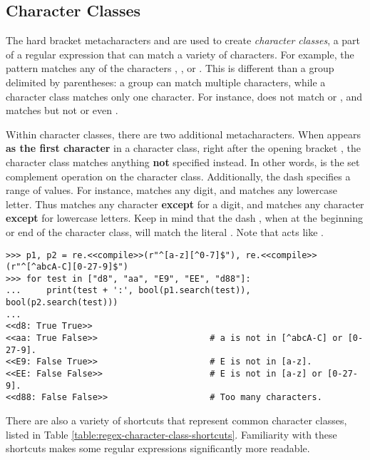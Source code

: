 \subsection*{Character Classes} %

The hard bracket metacharacters \li{[} and \li{]} are used to create \emph{character classes}, a part of a regular expression that can match a variety of characters.
For example, the pattern \li{[abc]} matches any of the characters , , or .
This is different than a group delimited by parentheses: a group can match multiple characters, while a character class matches only one character.
For instance, \li{[abc]} does not match  or , and  matches  but not  or even .

Within character classes, there are two additional metacharacters.
When \li{^} appears \textbf{as the first character} in a character class, right after the opening bracket \li{[}, the character class matches anything \textbf{not} specified instead.
In other words, \li{^} is the set complement operation on the character class.
Additionally, the dash \li{-} specifies a range of values.
For instance, \li{[0-9]} matches any digit, and \li{[a-z]} matches any lowercase letter.
Thus \li{[^0-9]} matches any character \textbf{except} for a digit, and \li{[^a-z]} matches any character \textbf{except} for lowercase letters. Keep in mind that the dash \li{-}, when at the beginning or end of the character class, will match the literal .
Note that \li{[0-27-9]} acts like \li{[(0-2)|(7-9)]}.


\begin{lstlisting}
>>> p1, p2 = re.<<compile>>(r"^[a-z][^0-7]$"), re.<<compile>>(r"^[^abcA-C][0-27-9]$")
>>> for test in ["d8", "aa", "E9", "EE", "d88"]:
...     print(test + ':', bool(p1.search(test)), bool(p2.search(test)))
...
<<d8: True True>>
<<aa: True False>>                      # a is not in [^abcA-C] or [0-27-9].
<<E9: False True>>                      # E is not in [a-z].
<<EE: False False>>                     # E is not in [a-z] or [0-27-9].
<<d88: False False>>                    # Too many characters.
\end{lstlisting}


There are also a variety of shortcuts that represent common character classes, listed in Table \ref{table:regex-character-class-shortcuts}.
Familiarity with these shortcuts makes some regular expressions significantly more readable.

